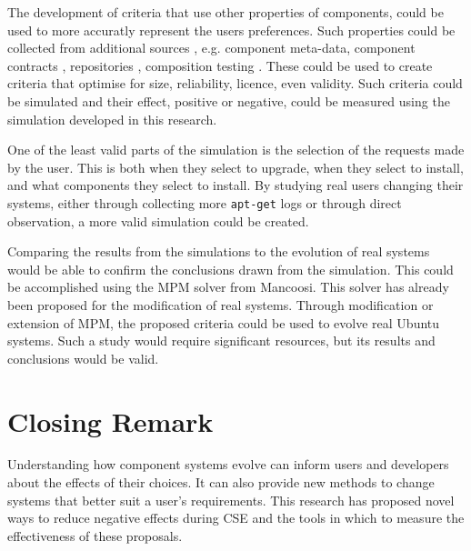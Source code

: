 The development of criteria that use other properties of components, 
could be used to more accuratly represent the users preferences.
Such properties could be collected from additional sources
, e.g. component meta-data, component contracts \citep{Watkins1999}, repositories \citep{Guo2000}, 
composition testing \citep{XuejieZhang2008}.
These could be used to create criteria that optimise for size, reliability, licence, even validity.
Such criteria could be simulated and their effect, positive or negative, 
could be measured using the simulation developed in this research.

One of the least valid parts of the simulation is the selection of the requests made by the user.
This is both when they select to upgrade, when they select to install, and what components they select to install.
By studying real users changing their systems, either through collecting more \texttt{apt-get} logs or through direct observation,
a more valid simulation could be created.

Comparing the results from the simulations to the evolution of real systems would be able to confirm the conclusions drawn from the simulation.
This could be accomplished using the MPM solver \citep{abate2011} from Mancoosi.
This solver has already been proposed for the modification of real systems.
Through modification or extension of MPM, the proposed criteria could be used to evolve real Ubuntu systems.
Such a study would require significant resources, but its results and conclusions would be valid.

\section{Closing Remark}
Understanding how component systems evolve can inform users and developers about the effects of their choices.
It can also provide new methods to change systems that better suit a user's requirements.
This research has proposed novel ways to reduce negative effects during CSE and the tools in which to measure the effectiveness of these proposals.
 

